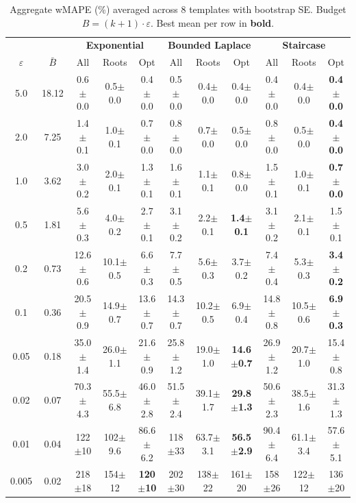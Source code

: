 \providecommand{\pmstd}[1]{{\scriptsize $\pm$#1}}

\begin{table}[t]
\centering
\setlength{\tabcolsep}{2.8pt}
\small
\caption{Aggregate wMAPE (\%) averaged across 8 templates with bootstrap SE. Budget $B = (k+1) \cdot \varepsilon$. Best mean per row in \textbf{bold}.}
\label{tab:rq1_kplus1_wmape}
\begin{tabular}{cc|ccc|ccc|ccc}
\toprule
& & \multicolumn{3}{c|}{\textbf{Exponential}} & \multicolumn{3}{c|}{\textbf{Bounded Laplace}} & \multicolumn{3}{c}{\textbf{Staircase}} \\
$\varepsilon$ & $\bar{B}$ & All & Roots & Opt & All & Roots & Opt & All & Roots & Opt \\
\midrule
5.0 & 18.12 & 0.6\pmstd{0.0} & 0.5\pmstd{0.0} & 0.4\pmstd{0.0} & 0.5\pmstd{0.0} & 0.4\pmstd{0.0} & 0.4\pmstd{0.0} & 0.4\pmstd{0.0} & 0.4\pmstd{0.0} & \textbf{0.4\pmstd{0.0}} \\
2.0 & 7.25 & 1.4\pmstd{0.1} & 1.0\pmstd{0.1} & 0.7\pmstd{0.0} & 0.8\pmstd{0.0} & 0.7\pmstd{0.0} & 0.5\pmstd{0.0} & 0.8\pmstd{0.0} & 0.5\pmstd{0.0} & \textbf{0.4\pmstd{0.0}} \\
1.0 & 3.62 & 3.0\pmstd{0.2} & 2.0\pmstd{0.1} & 1.3\pmstd{0.1} & 1.6\pmstd{0.1} & 1.1\pmstd{0.1} & 0.8\pmstd{0.0} & 1.5\pmstd{0.1} & 1.0\pmstd{0.1} & \textbf{0.7\pmstd{0.0}} \\
0.5 & 1.81 & 5.6\pmstd{0.3} & 4.0\pmstd{0.2} & 2.7\pmstd{0.1} & 3.1\pmstd{0.2} & 2.2\pmstd{0.1} & \textbf{1.4\pmstd{0.1}} & 3.1\pmstd{0.2} & 2.1\pmstd{0.1} & 1.5\pmstd{0.1} \\
0.2 & 0.73 & 12.6\pmstd{0.6} & 10.1\pmstd{0.5} & 6.6\pmstd{0.3} & 7.7\pmstd{0.5} & 5.6\pmstd{0.3} & 3.7\pmstd{0.2} & 7.4\pmstd{0.4} & 5.3\pmstd{0.3} & \textbf{3.4\pmstd{0.2}} \\
0.1 & 0.36 & 20.5\pmstd{0.9} & 14.9\pmstd{0.7} & 13.6\pmstd{0.7} & 14.3\pmstd{0.7} & 10.2\pmstd{0.5} & 6.9\pmstd{0.4} & 14.8\pmstd{0.8} & 10.5\pmstd{0.6} & \textbf{6.9\pmstd{0.3}} \\
0.05 & 0.18 & 35.0\pmstd{1.4} & 26.0\pmstd{1.1} & 21.6\pmstd{0.9} & 25.8\pmstd{1.2} & 19.0\pmstd{1.0} & \textbf{14.6\pmstd{0.7}} & 26.9\pmstd{1.2} & 20.7\pmstd{1.0} & 15.4\pmstd{0.8} \\
0.02 & 0.07 & 70.3\pmstd{4.3} & 55.5\pmstd{6.8} & 46.0\pmstd{2.8} & 51.5\pmstd{2.4} & 39.1\pmstd{1.7} & \textbf{29.8\pmstd{1.3}} & 50.6\pmstd{2.3} & 38.5\pmstd{1.6} & 31.3\pmstd{1.3} \\
0.01 & 0.04 & 122\pmstd{10} & 102\pmstd{9.6} & 86.6\pmstd{6.2} & 118\pmstd{33} & 63.7\pmstd{3.1} & \textbf{56.5\pmstd{2.9}} & 90.4\pmstd{6.4} & 61.1\pmstd{3.4} & 57.6\pmstd{5.1} \\
0.005 & 0.02 & 218\pmstd{18} & 154\pmstd{12} & \textbf{120\pmstd{10}} & 202\pmstd{30} & 138\pmstd{22} & 161\pmstd{20} & 158\pmstd{26} & 122\pmstd{12} & 136\pmstd{20} \\
\bottomrule
\end{tabular}
\end{table}
